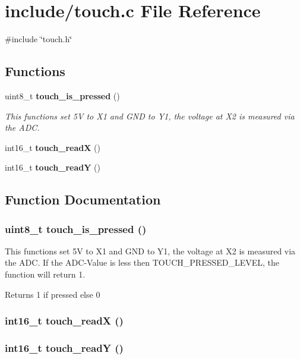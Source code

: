 \section{include/touch.c File Reference}
\label{touch_8c}
{\ttfamily \#include \char`\"{}touch.h\char`\"{}}\par
\subsection*{Functions}
\begin{DoxyCompactItemize}
\item 
uint8\_\-t {\bf touch\_\-is\_\-pressed} ()
\begin{DoxyCompactList}\small\item\em This functions set 5V to X1 and GND to Y1, the voltage at X2 is measured via the ADC. \item\end{DoxyCompactList}\item 
int16\_\-t {\bf touch\_\-readX} ()
\item 
int16\_\-t {\bf touch\_\-readY} ()
\end{DoxyCompactItemize}


\subsection{Function Documentation}
\subsubsection[{touch\_\-is\_\-pressed}]{\setlength{\rightskip}{0pt plus 5cm}uint8\_\-t touch\_\-is\_\-pressed ()}\label{touch_8c_a215947ded979abf11d490536508ecafc}


This functions set 5V to X1 and GND to Y1, the voltage at X2 is measured via the ADC. If the ADC-\/Value is less then TOUCH\_\-PRESSED\_\-LEVEL, the function will return 1. \begin{DoxyReturn}{Returns}
1 if pressed else 0 
\end{DoxyReturn}
\subsubsection[{touch\_\-readX}]{\setlength{\rightskip}{0pt plus 5cm}int16\_\-t touch\_\-readX ()}\label{touch_8c_adbea78d45cc89e43f7510ebf6eb01ac0}
\subsubsection[{touch\_\-readY}]{\setlength{\rightskip}{0pt plus 5cm}int16\_\-t touch\_\-readY ()}\label{touch_8c_acdce8a6997f2d00dbfcb61be2e67e886}
